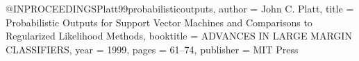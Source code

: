 @INPROCEEDINGS{Platt99probabilisticoutputs,
    author = {John C. Platt},
    title = {Probabilistic Outputs for Support Vector Machines and Comparisons to Regularized Likelihood Methods},
    booktitle = {ADVANCES IN LARGE MARGIN CLASSIFIERS},
    year = {1999},
    pages = {61--74},
    publisher = {MIT Press}
}